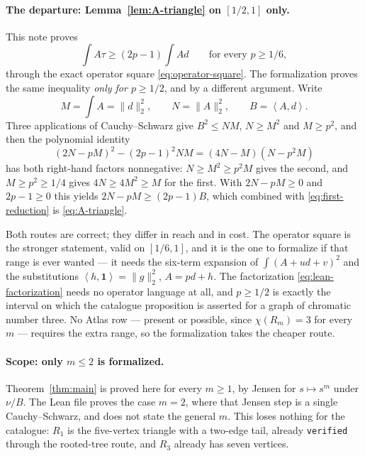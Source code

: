 \documentclass[11pt]{article}
\newcommand{\one}{\mathbf 1}
\newcommand{\ip}[2]{\left\langle #1,#2\right\rangle}
\begin{document}
\paragraph{The departure: Lemma~\ref{lem:A-triangle} on $[1/2,1]$ only.}
This note proves
\[
 \int A\tau\geq(2p-1)\int Ad
 \qquad\text{for every }p\geq1/6,
\]
through the exact operator square \eqref{eq:operator-square}.  The formalization
proves the same inequality \emph{only for $p\geq1/2$}, and by a different
argument.  Write
\[
 M=\int A=\lVert d\rVert_2^2,\qquad
 N=\lVert A\rVert_2^2,\qquad
 B=\ip{A}{d}.
\]
Three applications of Cauchy--Schwarz give $B^2\leq NM$, $N\geq M^2$ and
$M\geq p^2$, and then the polynomial identity
\begin{equation}
 (2N-pM)^2-(2p-1)^2NM=(4N-M)(N-p^2M)
 \label{eq:lean-factorization}
\end{equation}
has both right-hand factors nonnegative: $N\geq M^2\geq p^2M$ gives the second,
and $M\geq p^2\geq1/4$ gives $4N\geq4M^2\geq M$ for the first.  With
$2N-pM\geq0$ and $2p-1\geq0$ this yields $2N-pM\geq(2p-1)B$, which combined
with \eqref{eq:first-reduction} is \eqref{eq:A-triangle}.

Both routes are correct; they differ in reach and in cost.  The operator square
is the stronger statement, valid on $[1/6,1]$, and it is the one to formalize if
that range is ever wanted --- it needs the six-term expansion of
$\int(A+ud+v)^2$ and the substitutions $\ip{h}{\one}=\lVert g\rVert_2^2$,
$A=pd+h$.  The factorization \eqref{eq:lean-factorization} needs no operator
language at all, and $p\geq1/2$ is exactly the interval on which the catalogue
proposition is asserted for a graph of chromatic number three.  No Atlas row
--- present or possible, since $\chi(R_m)=3$ for every $m$ --- requires the
extra range, so the formalization takes the cheaper route.

\paragraph{Scope: only $m\leq2$ is formalized.}
Theorem~\ref{thm:main} is proved here for every $m\geq1$, by Jensen for
$s\mapsto s^m$ under $\nu/B$.  The Lean file proves the case $m=2$, where that
Jensen step is a single Cauchy--Schwarz, and does not state the general $m$.
This loses nothing for the catalogue: $R_1$ is the five-vertex triangle with a
two-edge tail, already \texttt{verified} through the rooted-tree route, and
$R_3$ already has seven vertices.
\end{document}
